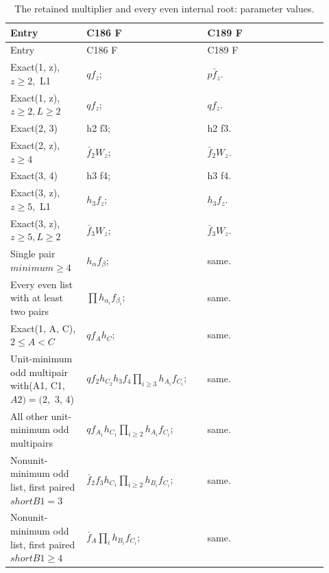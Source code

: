 \begingroup\small
\setlength{\tabcolsep}{3pt}
\setlength{\LTleft}{0pt}\setlength{\LTright}{\fill}
\begin{longtable}{@{}p{0.2200\linewidth}p{0.3500\linewidth}p{0.3500\linewidth}@{}}
\caption{The retained multiplier and every even internal root: parameter values.}\label{tab:parameters:r2-c042:2}\\
\toprule
Entry & C186 F & C189 F \\
\midrule\endfirsthead
\toprule
Entry & C186 F & C189 F \\
\midrule\endhead
\bottomrule\endfoot
Exact(1, z), \(z\ge 2,\allowbreak \) L1 & \(q f_z\); & \(p\bar f_z\). \\
\addlinespace[2pt]
Exact(1, z), \(z\ge 2,\allowbreak  L\ge 2\) & \(q f_z\); & \(q f_z\). \\
\addlinespace[2pt]
Exact(2, 3) & h2 f3; & h2 f3. \\
\addlinespace[2pt]
Exact(2, z), \(z\ge 4\) & \(\bar f_2 W_z\); & \(\bar f_2 W_z\). \\
\addlinespace[2pt]
Exact(3, 4) & h3 f4; & h3 f4. \\
\addlinespace[2pt]
Exact(3, z), \(z\ge 5,\allowbreak \) L1 & \(h_{3} f_z\); & \(h_{3} f_z\). \\
\addlinespace[2pt]
Exact(3, z), \(z\ge 5,\allowbreak  L\ge 2\) & \(\bar f_3 W_z\); & \(\bar f_3 W_z\). \\
\addlinespace[2pt]
Single pair \(minimum\ge 4\) & \(h_\alpha f_\beta\); & same. \\
\addlinespace[2pt]
Every even list with at least two pairs & \(\prod h_{\alpha_i} f_{\beta_i}\); & same. \\
\addlinespace[2pt]
Exact(1, A, C), \(2\le A<C\) & \(q f_A h_C\); & same. \\
\addlinespace[2pt]
Unit-minimum odd multipair with(A1, C1, \(A2)=(2,\allowbreak \) 3, 4) & \(q f_{2} h_{C_2} h_{3} f_{4} \prod_{i\ge 3}h_{A_i} f_{C_i}\); & same. \\
\addlinespace[2pt]
All other unit-minimum odd multipairs & \(q f_{A_1} h_{C_1} \prod_{i\ge 2}h_{A_i} f_{C_i}\); & same. \\
\addlinespace[2pt]
Nonunit-minimum odd list, first paired \(shortB1=3\) & \(\bar f_2 f_{3} h_{C_1} \prod_{i\ge 2}h_{B_i} f_{C_i}\); & same. \\
\addlinespace[2pt]
Nonunit-minimum odd list, first paired \(shortB1\ge 4\) & \(\bar f_{A} \prod_i h_{B_i} f_{C_i}\); & same. \\
\end{longtable}
\endgroup


